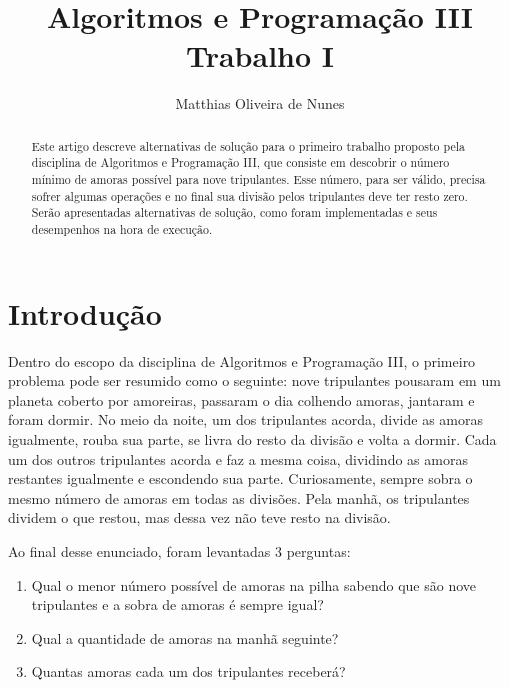 \documentclass[12pt]{article}
\title{Algoritmos e Programação III\\ Trabalho I}
\author{Matthias Oliveira de Nunes}
\begin{document}
\maketitle
\thispagestyle{empty}
\pagestyle{empty}

\begin{abstract}

Este artigo descreve alternativas de solução para o primeiro trabalho proposto pela disciplina de Algoritmos e Programação III, que consiste em descobrir o número mínimo de amoras possível para nove tripulantes. Esse número, para ser válido, precisa sofrer algumas operações e no final sua divisão pelos tripulantes deve ter resto zero. Serão apresentadas alternativas de solução, como foram implementadas e seus desempenhos na hora de execução.

\end{abstract}

\section{Introdução}

Dentro do escopo da disciplina de Algoritmos e Programação III, o primeiro problema pode ser resumido como o seguinte: nove tripulantes pousaram em um planeta coberto por amoreiras, passaram o dia colhendo amoras, jantaram e foram dormir. No meio da noite, um dos tripulantes acorda, divide as amoras igualmente, rouba sua parte, se livra do resto da divisão e volta a dormir. Cada um dos outros tripulantes acorda e faz a mesma coisa, dividindo as amoras restantes igualmente e escondendo sua parte. Curiosamente, sempre sobra o mesmo número de amoras em todas as divisões. Pela manhã, os tripulantes dividem o que restou, mas dessa vez não teve resto na divisão.

Ao final desse enunciado, foram levantadas 3 perguntas:

\begin{enumerate}

\item Qual o menor número possível de amoras na pilha sabendo que são nove tripulantes e a sobra de amoras é sempre igual?

\item Qual a quantidade de amoras na manhã seguinte?

\item Quantas amoras cada um dos tripulantes receberá?

\end{enumerate}
\end{document}
